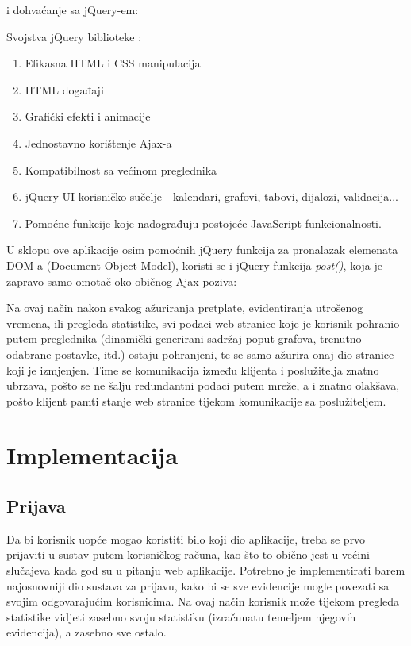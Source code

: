 \documentclass[times, utf8, zavrsni]{fer}
\begin{document}
i dohvaćanje sa jQuery-em:



Svojstva jQuery biblioteke \citep{jQuery}:
\begin{enumerate}
\item Efikasna HTML i CSS manipulacija
\item HTML događaji 
\item Grafički efekti i animacije
\item Jednostavno korištenje Ajax-a
\item Kompatibilnost sa većinom preglednika
\item jQuery UI korisničko sučelje - kalendari, grafovi, tabovi, dijalozi, validacija...
\item Pomoćne funkcije koje nadograđuju postojeće JavaScript funkcionalnosti.
\end{enumerate}

U sklopu ove aplikacije osim pomoćnih jQuery funkcija za pronalazak elemenata DOM-a (Document Object Model), koristi se i jQuery funkcija \emph{post()}, koja je zapravo samo omotač oko običnog Ajax poziva:



Na ovaj način nakon svakog ažuriranja pretplate, evidentiranja utrošenog vremena, ili pregleda statistike, svi podaci web stranice koje je korisnik pohranio putem preglednika (dinamički generirani sadržaj poput grafova, trenutno odabrane postavke, itd.) ostaju pohranjeni, te se samo ažurira onaj dio stranice koji je izmjenjen. Time se komunikacija između klijenta i poslužitelja znatno ubrzava, pošto se ne šalju redundantni podaci putem mreže, a i znatno olakšava, pošto klijent pamti stanje web stranice tijekom komunikacije sa poslužiteljem.\clearpage

\section{Implementacija}
\subsection{Prijava}
Da bi korisnik uopće mogao koristiti bilo koji dio aplikacije, treba se prvo prijaviti u sustav putem korisničkog računa, kao što to obično jest u većini slučajeva kada god su u pitanju web aplikacije. Potrebno je implementirati barem najosnovniji dio sustava za prijavu, kako bi se sve evidencije mogle povezati sa svojim odgovarajućim korisnicima. Na ovaj način korisnik može tijekom pregleda statistike vidjeti zasebno svoju statistiku (izračunatu temeljem njegovih evidencija), a zasebno sve ostalo.
\end{document}
